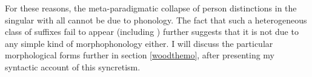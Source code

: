 \documentclass[output=paper]{langscibook}
\begin{document}
For these reasons, the meta-paradigmatic collapse of person distinctions in the singular with all \stvs cannot be due to phonology. The fact that such a heterogeneous class of suffixes fail to appear (including ) further suggests that it is not due to any simple kind of morphophonology either. I will discuss the particular morphological forms further in section \ref{woodthemo}, after presenting my syntactic account of this syncretism.







%

%


\end{document}
